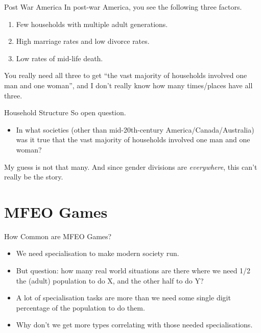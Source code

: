 \documentclass[
  ignorenonframetext,
]{beamer}
\providecommand{\tightlist}{%
  \setlength{\itemsep}{0pt}\setlength{\parskip}{0pt}}
\begin{document}
\begin{frame}{Post War America}
\protect\hypertarget{post-war-america}{}
In post-war America, you see the following three factors.

\begin{enumerate}
\tightlist
\item
  Few households with multiple adult generations.
\item
  High marriage rates and low divorce rates.
\item
  Low rates of mid-life death.
\end{enumerate}

You really need all three to get ``the vast majority of households
involved one man and one woman'', and I don't really know how many
times/places have all three.
\end{frame}

\begin{frame}{Household Structure}
\protect\hypertarget{household-structure}{}
So open question.

\begin{itemize}
\tightlist
\item
  In what societies (other than mid-20th-century
  America/Canada/Australia) was it true that the vast majority of
  households involved one man and one woman?
\end{itemize}

My guess is not that many. And since gender divisions are
\emph{everywhere}, this can't really be the story.
\end{frame}

\hypertarget{mfeo-games}{%
\section{MFEO Games}\label{mfeo-games}}

\begin{frame}{How Common are MFEO Games?}
\protect\hypertarget{how-common-are-mfeo-games}{}
\begin{itemize}
\tightlist
\item
  We need specialisation to make modern society run.
\item
  But question: how many real world situations are there where we need
  1/2 the (adult) population to do X, and the other half to do Y?
\item
  A lot of specialisation tasks are more than we need some single digit
  percentage of the population to do them.
\item
  Why don't we get more types correlating with those needed
  specialisations.
\end{itemize}
\end{frame}
\end{document}

